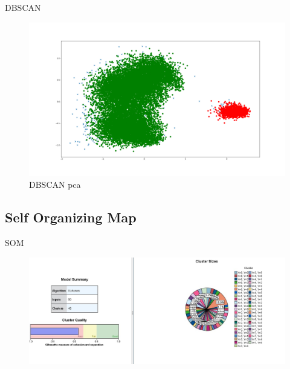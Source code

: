 \documentclass[12pt]{beamer}
\begin{document}
\begin{frame}{DBSCAN}
\begin{figure}
\includegraphics[scale=0.2]{../dbscan_pca_035_15}\vspace*{-10mm}
\caption{DBSCAN pca}
\end{figure}
\end{frame}

\subsection{Self Organizing Map}
\begin{frame}{SOM}
\begin{figure}
\includegraphics[scale=0.3]{../kohonen_spss.png}
\end{figure}
\end{frame}
\end{document}

